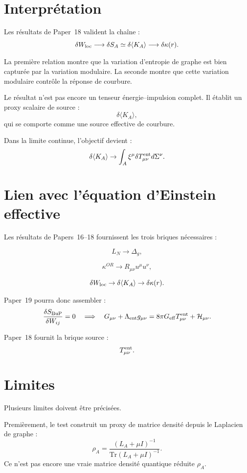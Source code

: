 \documentclass[11pt,a4paper]{article}
\begin{document}
\section{Interprétation}

Les résultats de Paper~18 valident la chaîne :
\[
\delta W_{\rm loc}
\longrightarrow
\delta S_A
\simeq
\delta\langle K_A\rangle
\longrightarrow
\delta\kappa(r).
\]

La première relation montre que la variation d'entropie de graphe est bien
capturée par la variation modulaire. La seconde montre que cette variation
modulaire contrôle la réponse de courbure.

Le résultat n'est pas encore un tenseur énergie--impulsion complet. Il établit
un proxy scalaire de source :
\[
\delta\langle K_A\rangle,
\]
qui se comporte comme une source effective de courbure.

Dans la limite continue, l'objectif devient :
\[
\delta\langle K_A\rangle
\to
\int_A \xi^\mu \delta T_{\mu\nu}^{\rm ent}d\Sigma^\nu.
\]

\section{Lien avec l'équation d'Einstein effective}

Les résultats de Papers~16--18 fournissent les trois briques nécessaires :

\[
L_N\to\Delta_g,
\]

\[
\kappa^{OR}
\to
R_{\mu\nu}u^\mu u^\nu,
\]

\[
\delta W_{\rm loc}
\to
\delta\langle K_A\rangle
\to
\delta\kappa(r).
\]

Paper~19 pourra donc assembler :
\[
\frac{\delta S_{\rm BuP}}{\delta W_{ij}}=0
\quad
\Longrightarrow
\quad
G_{\mu\nu}
+
\Lambda_{\rm ent}g_{\mu\nu}
=
8\pi G_{\rm eff}T_{\mu\nu}^{\rm ent}
+
\mathcal{H}_{\mu\nu}.
\]

Paper~18 fournit la brique source :
\[
T_{\mu\nu}^{\rm ent}.
\]

\section{Limites}

Plusieurs limites doivent être précisées.

Premièrement, le test construit un proxy de matrice densité depuis le
Laplacien de graphe :
\[
\rho_A=
\frac{(L_A+\mu I)^{-1}}{\mathrm{Tr}(L_A+\mu I)^{-1}}.
\]
Ce n'est pas encore une vraie matrice densité quantique réduite \(\rho_A\).
\end{document}
